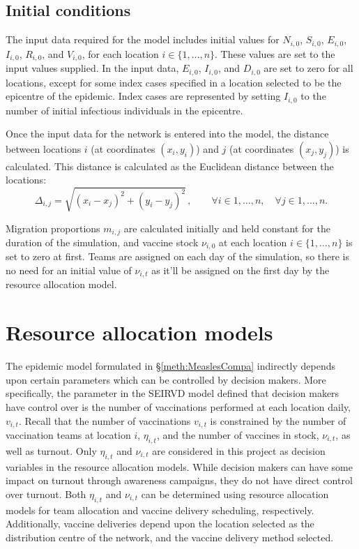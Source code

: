 \subsection{Initial conditions} %
The input data required for the model includes initial values for $N_{i,0}$, $S_{i,0}$, $E_{i,0}$, $I_{i,0}$, $R_{i,0}$, and $V_{i,0}$, for each location $i \in \{1,\dots,n\}$. These values are set to the input values supplied. 
In the input data, $E_{i,0}$, $I_{i,0}$, and $D_{i,0}$ are set to zero for all locations, except for some index cases specified in a location selected to be the epicentre of the epidemic. Index cases are represented by setting $I_{i,0}$ to the number of initial infectious individuals in the epicentre.

Once the input data for the network is entered into the model, the distance between locations $i$ (at coordinates $(x_{i},y_{i})$) and $j$ (at coordinates $(x_{j},y_{j})$) is calculated. This distance is calculated as the Euclidean distance between the locations: 
$$\Delta_{i,j} = \sqrt{(x_{i} - x_{j})^{2} + (y_{i} - y_{j})^{2}}\,, \qquad \forall{ i \in 1,\ldots,n},\quad \forall{ j \in 1,\ldots,n}.$$ 

Migration proportions $m_{i,j}$ are calculated initially and held constant for the duration of the simulation, and vaccine stock $\nu_{i,0}$ at each location $i \in \{1,\dots,n\}$ is set to zero at first. Teams are assigned on each day of the simulation, so there is no need for an initial value of $\nu_{i,t}$ as it'll be assigned on the first day by the resource allocation model. 

\section{Resource allocation models} %
\label{sec:meth_resAlloc}
The epidemic model formulated in \S \ref{meth:MeaslesCompa} indirectly depends upon certain parameters which can be controlled by decision makers. More specifically, the parameter in the SEIRVD model defined that decision makers have control over is the number of vaccinations performed at each location daily, $v_{i,t}$. Recall that the number of vaccinations $v_{i,t}$ is constrained by the number of vaccination teams at location $i$, $\eta_{i,t}$, and the number of vaccines in stock, $\nu_{i,t}$, as well as turnout. Only $\eta_{i,t}$ and $\nu_{i,t}$ are considered in this project as decision variables in the resource allocation models. While decision makers can have some impact on turnout through awareness campaigns, they do not have direct control over turnout. Both $\eta_{i,t}$ and $\nu_{i,t}$ can be determined using resource allocation models for team allocation and vaccine delivery scheduling, respectively. Additionally, vaccine deliveries depend upon the location selected as the distribution centre of the network, and the vaccine delivery method selected. 


